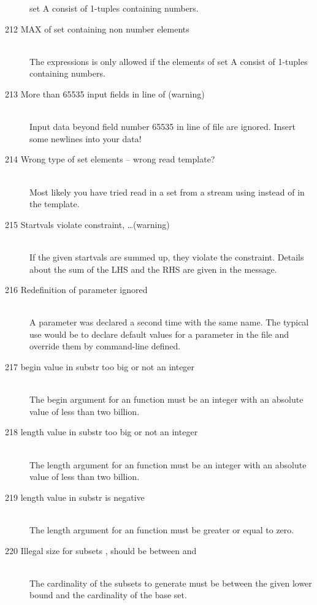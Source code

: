 \begin{description}
   set A consist of 1-tuples containing numbers.  
\item[212 MAX of set containing non number elements]\ \\
   The expressions  is only allowed if the elements of 
   set A consist of 1-tuples containing numbers.  
\item[213 More than 65535 input fields in line \code{xxx} of
   \code{yyy} (warning)]\ \\
   Input data beyond field number 65535 in line  of file
    are ignored. Insert some newlines into your data!
\item[214 Wrong type of set elements -- wrong read template?]\ \\
   Most likely you have tried read in a set from a stream using
    instead of  in the template. 
\item[215 Startvals violate constraint, \ldots (warning)]\ \\
   If the given startvals are summed up, they violate the
   constraint. Details about the sum of the LHS and the RHS are given
   in the message.
\item[216 Redefinition of parameter \code{xxx} ignored]\ \\
   A parameter was declared a second time with the same name. The
   typical use would be to declare default values for a parameter in
   the \zimpl file and override them by command-line defined.
\item[217 begin value \code{xxx} in substr too big or not an integer]\ \\
   The begin argument for an  function
   must be an integer with an absolute value of less than two billion.
\item[218 length value \code{xxx} in substr too big or not an integer]\ \\
   The length argument for an  function
   must be an integer with an absolute value of less than two billion.
\item[219 length value \code{xxx} in substr is negative]\ \\
   The length argument for an  function
   must be greater or equal to zero.
\item[220 Illegal size for subsets \code{xxx}, should be between \code{yyy} 
  and \code{zzz}]\ \\
  The cardinality of the subsets to generate must be between the
  given lower bound and the cardinality of the base set.

\end{description}

